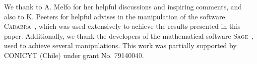 \documentclass[aps,prl,twocolumn,superscriptaddress,showpacs,showkeys]{revtex4-1}
\begin{document}


\begin{acknowledgments}
  We thank to A. Melfo for her helpful discussions and inspiring comments, and also to K. Peeters for helpful advises in the manipulation of the software \textsc{Cadabra}~\cite{Peeters:2007wn,*peeters2007symbolic,*Peeters2007550}, which was used extensively to achieve the results presented in this paper. Additionally, we thank the developers of the mathematical software \textsc{Sage}~\cite{sage}, used to achieve several manipulations. This work was partially supported by CONICYT (Chile) under grant No. 79140040.
\end{acknowledgments}




\end{document}

